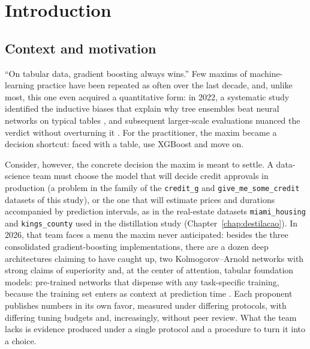 \chapter{Introduction}
\label{chap:introducao}

\section{Context and motivation}
\label{sec:intro-contexto}

``On tabular data, gradient boosting always wins.'' Few maxims of
machine-learning practice have been repeated as often over the last
decade, and, unlike most, this one even acquired a quantitative form: in
2022, a systematic study identified the inductive biases that explain
why tree ensembles beat neural networks on typical tables
\citep{grinsztajn2022}, and subsequent larger-scale evaluations nuanced
the verdict without overturning it \citep{mcelfresh2023}. For the
practitioner, the maxim became a decision shortcut: faced with a table,
use XGBoost and move on.

Consider, however, the concrete decision the maxim is meant to settle.
A data-science team must choose the model that will decide credit
approvals in production (a problem in the family of the
\texttt{credit\_g} and
\texttt{give\_\allowbreak me\_\allowbreak some\_\allowbreak credit}
datasets of this study), or the one that will estimate prices and
durations accompanied by prediction intervals, as in the real-estate
datasets \texttt{miami\_housing} and \texttt{kings\_county} used in the
distillation study (Chapter~\ref{chap:destilacao}). In 2026, that team
faces a menu the maxim never anticipated: besides the three
consolidated gradient-boosting implementations, there are a dozen deep
architectures claiming to have caught up, two Kolmogorov--Arnold
networks with strong claims of superiority and, at the center of
attention, tabular foundation models: pre-trained networks that
dispense with any task-specific training, because the training set
enters as context at prediction time \citep{hollmann2025,tabfm2026}.
Each proponent publishes numbers in its own favor, measured under
differing protocols, with differing tuning budgets and, increasingly,
without peer review. What the team lacks is evidence produced under a
single protocol and a procedure to turn it into a choice.

